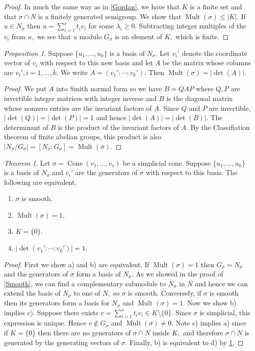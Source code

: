 \documentclass[BSc]{usydthesis}
\numberwithin{equation}{chapter}
\theoremstyle{remark}
\newtheorem{Theorem}[equation]{Theorem}
\newtheorem{Proposition}[equation]{Proposition}
\newcommand{\M}{\operatorname{Mult}}
\DeclareMathOperator{\Cone}{Cone}
\begin{document}
\begin{proof} In much the same way as in \ref{Gordan}, we have that $K$ is a finite set and that $\sigma \cap N$ is a finitely generated semigroup. We show that $\M(\sigma) \leq |K|.$ If $u\in N_{\sigma}$ then $u=\sum_{i=1}^s t_i v_i$ for some $\lambda_i\geq 0.$ Subtracting integer multiples of the $v_i$ from $u,$ we see that $u$ modulo $G_{\sigma}$ is an element of $K,$ which is finite.
\end{proof}
\begin{Proposition}\label{PX}
 Suppose $\{ u_1, \ldots, u_k \} $ is a basis of $N_{\sigma}.$ Let $v_i'$ denote the coordinate vector of $v_i$ with respect to this new basis and let $A$ be the matrix whose columns are $v_i', i=1,\ldots, k.$ We write $A= (v_1' : \cdots : v_k').$  Then $\M(\sigma) = |\det(A)|.$
\end{Proposition}
\begin{proof}
 We put $A$ into Smith normal form so we have $B= Q A P$ where $Q,P$ are invertible integer matrices with integer inverse and $B$ is the diagonal matrix whose nonzero entries are the invariant factors of $A.$ Since $Q$ and $P$ are invertible, $|\det(Q)|= |\det(P)|=1$ and hence $|\det(A)| = |\det(B)|.$ The determinant of $B$ is the product of the invariant factors of $A.$ By the Classifiation theorem of finite abelian groups, this product is also $| N_{\sigma}/G_{\sigma}| = [N_{\sigma}: G_{\sigma}]=\M(\sigma).$
\end{proof}
\begin{Theorem}\label{PZ} Let $\sigma=\Cone(v_1,\ldots, v_s)$ be a simplicial cone. Suppose $\{ u_1, \ldots, u_k\}$ is a basis of $N_{\sigma}$ and $v_i'$ are the generators of $\sigma$ with respect to this basis. The following are equivalent.
~
\begin{enumerate}
 \item $\sigma$ is smooth.
 \item $\M(\sigma)=1.$
 \item $K= \{0\}.$
 \item $|\det (v_1' : \cdots : v_k')|=1.$
\end{enumerate}
\end{Theorem}
\begin{proof}
 First we show a) and b) are equivalent. If $\M(\sigma)=1$ then $G_{\sigma}=N_{\sigma}$ and the generators of $\sigma$ form a basis of $N_{\sigma}.$ As we showed in the proof of \ref{Smooth}, we can find a complementary submodule to $N_{\sigma}$ in $N$ and hence we can extend the basis of $N_{\sigma}$ to one of $N,$ so $\sigma$ is smooth. Conversely, if $\sigma$ is smooth then its generators form a basis for $N_{\sigma}$ and $\M(\sigma)=1.$ Now we show b) implies c). Suppose there exists $v=\sum_{i=1}^s t_i v_i \in K\setminus\{0\}.$ Since $\sigma$ is simplicial, this expression is unique. Hence $v\notin G_{\sigma}$ and $\M(\sigma) \neq 0.$ Note c) implies a) since if $K=\{ 0 \}$ then there are no generators of $\sigma \cap N$ inside $K,$ and therefore $\sigma \cap N$ is generated by the generating vectors of $\sigma.$ Finally, b) is equivalent to d) by \ref{PX}.
\end{proof}
\end{document}
